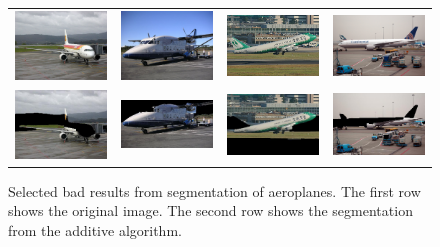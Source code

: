 \documentclass[10pt,twocolumn,letterpaper]{article}
\begin{document}
\begin{figure}[p]
\centering
\begin{tabular}{ p{3cm} p{3cm} p{3cm} p{3cm} }
\includegraphics[width=2.95cm]{figures/add_res/plane/2008_000804.jpg.eps} &
\includegraphics[width=2.95cm]{figures/add_res/plane/2008_001805.jpg.eps} &
\includegraphics[width=2.95cm]{figures/add_res/plane/2008_002358.jpg.eps} &
\includegraphics[width=2.95cm]{figures/add_res/plane/2008_003673.jpg.eps} \\
\includegraphics[width=2.95cm]{figures/add_res/plane/2008_000804.jpg_2_bad.jpg.eps} &
\includegraphics[width=2.95cm]{figures/add_res/plane/2008_001805.jpg_2_okay.jpg.eps} &
\includegraphics[width=2.95cm]{figures/add_res/plane/2008_002358.jpg_2_okay.jpg.eps} &
\includegraphics[width=2.95cm]{figures/add_res/plane/2008_003673.jpg_2_bad.jpg.eps} \\
\end{tabular}
\caption{Selected bad results from segmentation of aeroplanes.
 The first row shows the original image.  The second row shows
the segmentation from the additive algorithm.}
\label{fig:aeroplane_bad_results}
\end{figure}
\end{document}
